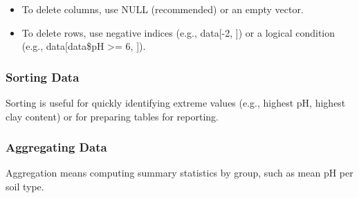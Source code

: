 \documentclass[
  10pt,
  b5paper,
  oneside]{book}
\newenvironment{Shaded}{\begin{snugshade}}{\end{snugshade}}
\newcommand{\CommentTok}[1]{\textcolor[rgb]{0.56,0.35,0.01}{\textit{#1}}}
\newcommand{\FunctionTok}[1]{\textcolor[rgb]{0.13,0.29,0.53}{\textbf{#1}}}
\newcommand{\NormalTok}[1]{#1}
\newcommand{\SpecialCharTok}[1]{\textcolor[rgb]{0.81,0.36,0.00}{\textbf{#1}}}
\begin{document}
\begin{itemize}
\item
  To delete columns, use NULL (recommended) or an empty vector.
\item
  To delete rows, use negative indices (e.g., data{[}-2, {]}) or a logical condition (e.g., data{[}data\$pH \textgreater= 6, {]}).
\end{itemize}

\subsubsection{Sorting Data}\label{sort-rows}

Sorting is useful for quickly identifying extreme values (e.g., highest pH, highest clay content) or for preparing tables for reporting.

\begin{Shaded}
\end{Shaded}

\subsubsection{Aggregating Data}\label{aggregate-rows}

Aggregation means computing summary statistics by group, such as mean pH per soil type.
\end{document}

